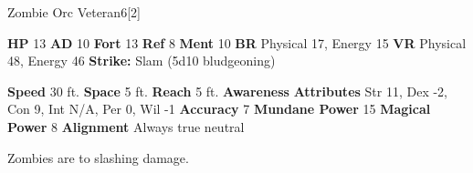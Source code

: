  \begin{monsubsection}{Zombie Orc Veteran}{6}[2]
    \vspace{-1em}\vspace{-1em}
    \vspace{0em}

    
    

    \begin{spellcontent}
      \begin{spelltargetinginfo}
        \pari \textbf{HP} 13 \monsep
          \textbf{AD} 10 \monsep
          \textbf{Fort} 13 \monsep
          \textbf{Ref} 8 \monsep
          \textbf{Ment} 10
        \pari \textbf{BR} Physical 17, Energy 15 \monsep
        \textbf{VR} Physical 48, Energy 46
        \pari \textbf{Strike:}
            Slam  (5d10 bludgeoning)
      \end{spelltargetinginfo}
    \end{spellcontent}
    \begin{monsterfooter}
      \pari \textbf{Speed} 30 ft. \monsep
        \textbf{Space} 5 ft. \monsep
        \textbf{Reach} 5 ft.
      \pari \textbf{Awareness} 
      \pari \textbf{Attributes}
        Str 11, Dex -2,
        Con 9, Int N/A,
        Per 0, Wil -1
      \pari \textbf{Accuracy} 7 \monsep
        \textbf{Mundane Power} 15 \monsep
      \textbf{Magical Power} 8
      \pari \textbf{Alignment} Always true neutral
    \end{monsterfooter}
  \end{monsubsection}
          Zombies are  to slashing damage.
  

